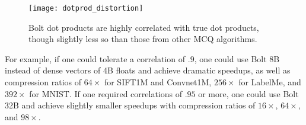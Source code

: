 \begin{figure}[h]
\begin{center}
\texttt{[image: dotprod\_distortion]}
\vspace*{-2mm}
\caption{Bolt dot products are highly correlated with true dot products, though slightly less so than those from other MCQ algorithms.}
\label{fig:dotprod_distortion}
\end{center}
\end{figure}

For example, if one could tolerate a correlation of $.9$, one could use Bolt 8B instead of dense vectors of 4B floats and achieve dramatic speedups, as well as compression ratios of $64\times$ for SIFT1M and Convnet1M, $256\times$ for LabelMe, and $392\times$ for MNIST. If one required correlations of $.95$ or more, one could use Bolt 32B and achieve slightly smaller speedups with compression ratios of $16\times$, $64\times$, and $98\times$.









